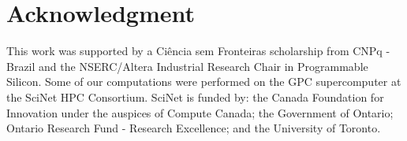 \documentclass[journal]{IEEEtran}
\begin{document}
\section*{Acknowledgment}
This work was supported by a Ci\^{e}ncia sem Fronteiras scholarship from CNPq - Brazil and the NSERC/Altera Industrial Research Chair in Programmable Silicon. Some of our computations were performed on the GPC supercomputer at the SciNet HPC Consortium. SciNet is funded by: the Canada Foundation for Innovation under the auspices of Compute Canada; the Government of Ontario; Ontario Research Fund - Research Excellence; and the University of Toronto.




\end{document}
